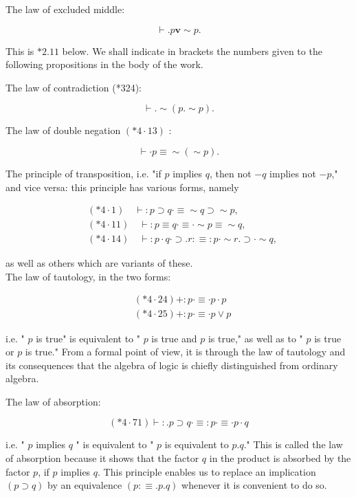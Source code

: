 \documentclass[10pt]{article}
\begin{document}
The law of excluded middle:

$$
\vdash . p \mathbf{v} \sim p .
$$

This is $* 2.11$ below. We shall indicate in brackets the numbers given to the following propositions in the body of the work.

The law of contradiction (*324):

$$
\vdash . \sim(p . \sim p) .
$$

The law of double negation $(* 4 \cdot 13)$ :

$$
\vdash \cdot p \equiv \sim(\sim p) .
$$

The principle of transposition, i.e. "if $p$ implies $q$, then not $-q$ implies not $-p$," and vice versa: this principle has various forms, namely

$$
\begin{aligned}
& (* 4 \cdot 1) \quad \vdash: p \supset q \cdot \equiv \sim q \supset \sim p, \\
& (* 4 \cdot 11) \quad \vdash: p \equiv q \cdot \equiv \cdot \sim p \equiv \sim q, \\
& (* 4 \cdot 14) \quad \vdash: p \cdot q \cdot \supset . r: \equiv: p \cdot \sim r . \supset \cdot \sim q,
\end{aligned}
$$

as well as others which are variants of these.\\
The law of tautology, in the two forms:

$$
\begin{aligned}
& (* 4 \cdot 24)+: p \cdot \equiv \cdot p \cdot p \\
& (* 4 \cdot 25)+: p \cdot \equiv \cdot p \vee p
\end{aligned}
$$

i.e. " $p$ is true" is equivalent to " $p$ is true and $p$ is true," as well as to " $p$ is true or $p$ is true." From a formal point of view, it is through the law of tautology and its consequences that the algebra of logic is chiefly distinguished from ordinary algebra.

The law of absorption:

$$
(* 4 \cdot 71) \vdash: . p \supset q \cdot \equiv: p \cdot \equiv \cdot p \cdot q
$$

i.e. " $p$ implies $q$ " is equivalent to " $p$ is equivalent to $p . q$." This is called the law of absorption because it shows that the factor $q$ in the product is absorbed by the factor $p$, if $p$ implies $q$. This principle enables us to replace an implication $(p \supset q)$ by an equivalence $(p: \equiv . p . q)$ whenever it is convenient to do so.
\end{document}

